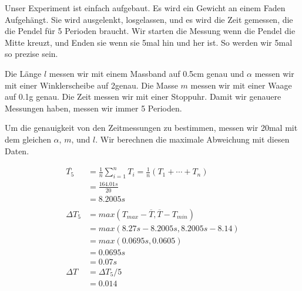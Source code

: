 \documentclass[12pt, a4paper, twoside]{article}
\begin{document}
Unser Experiment ist einfach aufgebaut.
Es wird ein Gewicht an einem Faden Aufgehängt.
Sie wird ausgelenkt, losgelassen, und es wird die Zeit gemessen, die die Pendel für 5 Perioden braucht.
Wir starten die Messung wenn die Pendel die Mitte kreuzt, und Enden sie wenn sie 5mal hin und her ist. So werden wir 5mal so prezise sein.

Die Länge $l$ messen wir mit einem Massband auf 0.5cm genau und $\alpha$ messen wir mit einer Winklerscheibe auf 2\textdegree genau.
Die Masse $m$ messen wir mit einer Waage auf 0.1g genau.
Die Zeit messen wir mit einer Stoppuhr. Damit wir genauere Messungen haben, messen wir immer 5 Perioden.

Um die genauigkeit von den Zeitmessungen zu bestimmen, messen wir 20mal mit dem gleichen $\alpha$, $m$, und $l$.
Wir berechnen die maximale Abweichung mit diesen Daten.



\begin{align*}
  \overline{T_5} & = \frac{1}{n} \sum_{i=1}^{n} T_{i}=\frac{1}{n}\left(T_{1}+\cdots+T_{n}\right) \\
                 & =\frac{164.01s}{20}                                                           \\
                 & =8.2005s                                                                      \\
  \\
  \Delta T_5     & = max(T_{max} - \overline{T}, \overline{T} - T_{min})                         \\
                 & = max(8.27s - 8.2005s, 8.2005s - 8.14)                                        \\
                 & = max(0.0695s, 0.0605)                                                        \\
                 & = 0.0695s                                                                     \\
                 & = 0.07s                                                                       \\
  \Delta T       & = \Delta T_5 / 5                                                              \\
                 & =0.014                                                                        \\
\end{align*}
\end{document}
